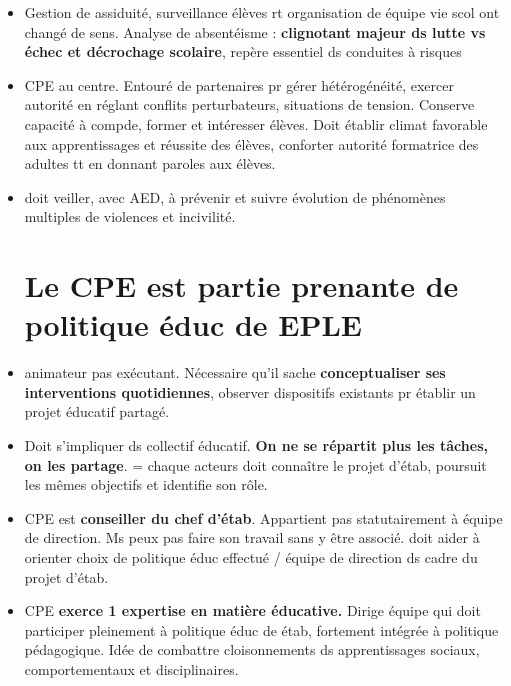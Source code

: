 \documentclass[12pt]{report}
\begin{document}
\begin{itemize}
\begin{itemize}
\item Gestion de assiduité, surveillance élèves rt organisation de équipe vie scol ont changé de sens. Analyse de absentéisme : \textbf{clignotant majeur ds lutte vs échec et décrochage scolaire}, repère essentiel ds conduites à risques \\

\item CPE au centre. Entouré de partenaires pr gérer hétérogénéité, exercer autorité en réglant conflits perturbateurs, situations de tension. Conserve capacité à compde, former et intéresser élèves. Doit établir climat favorable aux apprentissages et réussite des élèves, conforter autorité formatrice des adultes tt en donnant paroles aux élèves. \\

\item doit veiller, avec AED,  à prévenir et suivre évolution de phénomènes multiples de violences et incivilité.

\section{Le CPE est partie prenante de politique éduc de EPLE}

\item animateur pas exécutant. Nécessaire qu'il sache \textbf{conceptualiser ses interventions quotidiennes}, observer dispositifs existants pr établir un projet éducatif partagé.\\

\item Doit s'impliquer ds collectif éducatif. \textbf{On ne se répartit plus les tâches, on les partage}. = chaque acteurs doit connaître le projet d'étab, poursuit les mêmes objectifs et identifie son rôle.\\

\item CPE est \textbf{conseiller du chef d'étab}. Appartient pas statutairement  à équipe de direction. Ms peux pas faire son travail sans y être associé. doit aider à orienter choix de politique éduc effectué / équipe de direction ds cadre du projet d'étab. \\

 \item CPE \textbf{exerce 1 expertise en matière éducative.} Dirige équipe qui doit participer pleinement à politique éduc de étab, fortement intégrée à politique pédagogique. Idée de combattre cloisonnements ds apprentissages sociaux, comportementaux et disciplinaires. \\



\end{itemize}
\end{itemize}
\end{document}
